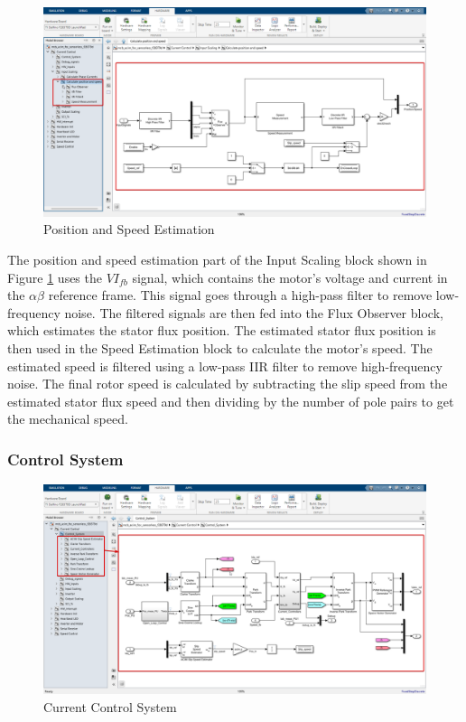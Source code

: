 \begin{figure}
	\centering
	\includegraphics[width=7in]{sections/section3/images/simulation/inputScaling/fluxObserver.png}
	\caption{Position and Speed Estimation}
	\label{fig:position_speed_estimation}
\end{figure}


The position and speed estimation part of the Input Scaling block shown in  Figure \ref{fig:position_speed_estimation} uses the $VI_{fb}$ signal, which contains the motor's voltage and current in the $\alpha \beta$ reference frame. This signal goes through a high-pass filter to remove low-frequency noise. The filtered signals are then fed into the Flux Observer block, which estimates the stator flux position. The estimated stator flux position is then used in the Speed Estimation block to calculate the motor's speed. The estimated speed is filtered using a low-pass IIR filter to remove high-frequency noise. The final rotor speed is calculated by subtracting the slip speed from the estimated stator flux speed and then dividing by the number of pole pairs to get the mechanical speed.

\subsubsection{Control System}



\begin{figure}
	\centering
	\includegraphics[width=7in]{sections/section3/images/simulation/currentControl/controlSystem.png}
	\caption{Current Control System}
	\label{fig:current_control_system}
\end{figure}


